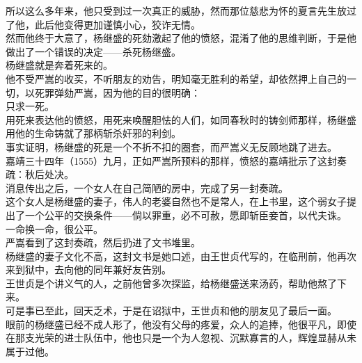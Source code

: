 \begin{multicols}{\theparacolNo}
所以这么多年来，他只受到过一次真正的威胁，然而那位慈悲为怀的夏言先生放过了他，此后他变得更加谨慎小心，狡诈无情。\\

然而他终于大意了，杨继盛的死劾激起了他的愤怒，混淆了他的思维判断，于是他做出了一个错误的决定——杀死杨继盛。\\

杨继盛就是奔着死来的。\\

他不受严嵩的收买，不听朋友的劝告，明知毫无胜利的希望，却依然押上自己的一切，以死罪弹劾严嵩，因为他的目的很明确：\\

只求一死。\\

用死来表达他的愤怒，用死来唤醒胆怯的人们，如同春秋时的铸剑师那样，杨继盛用他的生命铸就了那柄斩杀奸邪的利剑。\\

事实证明，杨继盛的死是一个不折不扣的圈套，而严嵩义无反顾地跳了进去。\\

嘉靖三十四年（1555）九月，正如严嵩所预料的那样，愤怒的嘉靖批示了这封奏疏：秋后处决。\\

消息传出之后，一个女人在自己简陋的房中，完成了另一封奏疏。\\

这个女人是杨继盛的妻子，伟人的老婆自然也不是常人，在上书里，这个弱女子提出了一个公平的交换条件——倘以罪重，必不可赦，愿即斩臣妾首，以代夫诛。\\

一命换一命，很公平。\\

严嵩看到了这封奏疏，然后扔进了文书堆里。\\

杨继盛的妻子文化不高，这封文书是她口述，由王世贞代写的，在临刑前，他再次来到狱中，去向他的同年兼好友告别。\\

王世贞是个讲义气的人，之前他曾多次探监，给杨继盛送来汤药，帮助他熬了下来。\\

可是事已至此，回天乏术，于是在诏狱中，王世贞和他的朋友见了最后一面。\\

眼前的杨继盛已经不成人形了，他没有父母的疼爱，众人的追捧，他很平凡，即使在那支光荣的进士队伍中，他也只是一个为人忽视、沉默寡言的人，辉煌显赫从未属于过他。\\


\end{multicols}
